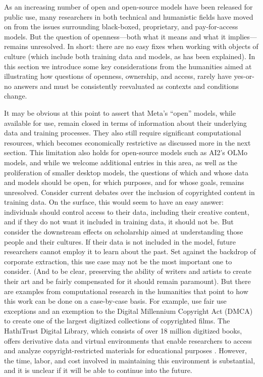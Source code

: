 As an increasing number of open and open-source models have been released for public use, many researchers in both technical and humanistic fields have moved on from the issues surrounding black-boxed, proprietary, and pay-for-access models. But the question of openness---both what it means and what it implies---remains unresolved. In short: there are no easy fixes when working with objects of culture (which include both training data and models, as has been explained). In this section we introduce some key considerations from the humanities aimed at illustrating how questions of openness, ownership, and access, rarely have yes-or-no answers and must be consistently reevaluated as contexts and conditions change.   

It may be obvious at this point to assert that Meta’s ``open'' models, while available for use, remain closed in terms of information about their underlying data and training processes. They also still require significant computational resources, which becomes economically restrictive as discussed more in the next section. This limitation also holds for open-source models such as AI2’s OLMo models, and while we welcome additional entries in this area, as well as the proliferation of smaller desktop models, the questions of which and whose data and models should be open, for which purposes, and for whose goals, remains unresolved. Consider current debates over the inclusion of copyrighted content in training data. On the surface, this would seem to have an easy answer: individuals should control access to their data, including their creative content, and if they do not want it included in training data, it should not be. But consider the downstream effects on scholarship aimed at understanding those people and their cultures. If their data is not included in the model, future researchers cannot employ it to learn about the past. Set against the backdrop of corporate extraction, this use case may not be the most important one to consider. (And to be clear, preserving the ability of writers and artists to create their art and be fairly compensated for it should remain paramount). But there are examples from computational research in the humanities that point to how this work can be done on a case-by-case basis. For example, \cite{Bamman_Samberg_So_Zhou_2024} use fair use exceptions and an exemption to the Digital Millennium Copyright Act (DMCA) to create one of the largest digitized collections of copyrighted films. The HathiTrust Digital Library, which consists of over 18 million digitized books, offers derivative data and virtual environments that enable researchers to access and analyze copyright-restricted materials for educational purposes \cite{hathitrust}. However, the time, labor, and cost involved in maintaining this environment is substantial, and it is unclear if it will be able to continue into the future. 

